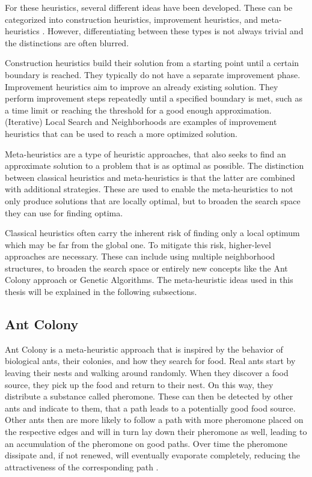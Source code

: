 For these heuristics, several different ideas have been developed. 
These can be categorized into construction heuristics, improvement heuristics, and meta-heuristics \cite{laporte_5_2002,ropke_heuristic_2005}.
However, differentiating between these types is not always trivial and the distinctions are often blurred.

Construction heuristics build their solution from a starting point until a certain boundary is reached. 
They typically do not have a separate improvement phase.
Improvement heuristics aim to improve an already existing solution.
They perform improvement steps repeatedly until a specified boundary is met, such as a time limit or reaching the threshold for a good enough approximation.
(Iterative) Local Search and Neighborhoods are examples of improvement heuristics that can be used to reach a more optimized solution.

Meta-heuristics are a type of heuristic approaches, that also seeks to find an approximate solution to a problem that is as optimal as possible.
The distinction between classical heuristics and meta-heuristics is that the latter are combined with additional strategies.
These are used to enable the meta-heuristics to not only produce solutions that are locally optimal, but to broaden the search space they can use for finding optima.

Classical heuristics often carry the inherent risk of finding only a local optimum which may be far from the global one.
To mitigate this risk, higher-level approaches are necessary.
These can include using multiple neighborhood structures, to broaden the search space or entirely new concepts like the Ant Colony approach or Genetic Algorithms. 
The meta-heuristic ideas used in this thesis will be explained in the following subsections.



\subsection{Ant Colony}
\label{subsec:antColonyBackground}

Ant Colony is a meta-heuristic approach that is inspired by the behavior of biological ants, their colonies, and how they search for food.
Real ants start by leaving their nests and walking around randomly. 
When they discover a food source, they pick up the food and return to their nest.
On this way, they distribute a substance called pheromone.
These can then be detected by other ants and indicate to them, that a path leads to a potentially good food source. 
Other ants then are more likely to follow a path with more pheromone placed on the respective edges and will in turn lay down their pheromone as well, leading to an accumulation of the pheromone on good paths.
Over time the pheromone dissipate and, if not renewed, will eventually evaporate completely, reducing the attractiveness of the corresponding path \cite{gendreau_handbook_2010, dorigo_ant_1996}. 

